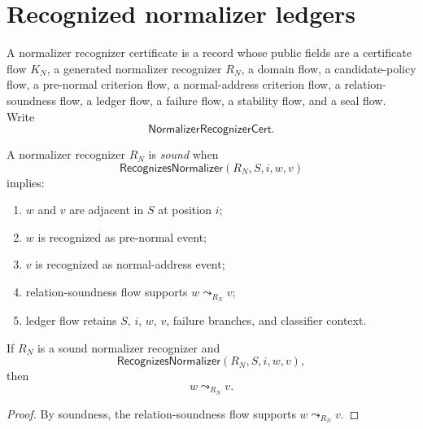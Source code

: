 \section{Recognized normalizer ledgers}
\label{sec:source-normalizer-recognized-ledgers}

\begin{definition}
\label{def:source-normalizer-recognizer-certificate}
A normalizer recognizer certificate is a record whose public fields are a certificate flow $K_N$, a generated normalizer recognizer $R_N$, a domain flow, a candidate-policy flow, a pre-normal criterion flow, a normal-address criterion flow, a relation-soundness flow, a ledger flow, a failure flow, a stability flow, and a seal flow. Write
$$
  \mathsf{NormalizerRecognizerCert}.
$$
\end{definition}

\begin{definition}
\label{def:source-normalizer-soundness}
A normalizer recognizer $R_N$ is \emph{sound} when
$$
  \mathsf{RecognizesNormalizer}(R_N,S,i,w,v)
$$
implies:
\begin{enumerate}
\item $w$ and $v$ are adjacent in $S$ at position $i$;
\item $w$ is recognized as pre-normal event;
\item $v$ is recognized as normal-address event;
\item relation-soundness flow supports $w\leadsto_{R_N}v$;
\item ledger flow retains $S$, $i$, $w$, $v$, failure branches, and classifier context.
\end{enumerate}
\end{definition}

\begin{theorem}
\label{thm:source-normalizer-sound-recognizer-establishes-relation}
If $R_N$ is a sound normalizer recognizer and
$$
  \mathsf{RecognizesNormalizer}(R_N,S,i,w,v),
$$
then
$$
  w\leadsto_{R_N}v.
$$
\end{theorem}

\begin{proof}
By soundness, the relation-soundness flow supports $w\leadsto_{R_N}v$.
\end{proof}

